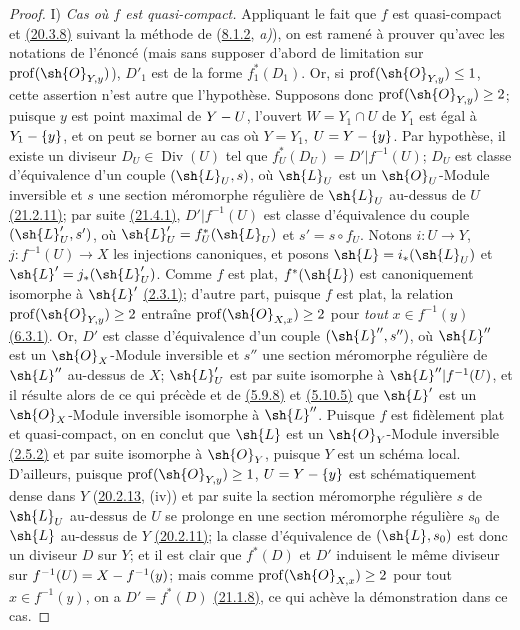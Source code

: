 \begin{proof}
\textup{I)} \emph{Cas où $f$ est quasi-compact.} Appliquant le fait que $f$
est quasi-compact et {\hyperlink{ega4.c04.prop.20-3-8}{(20.3.8)}}
suivant la méthode de ({\hyperref[canon-index.ega4.c04.statement.8-1-2]{8.1.2}},
\emph{a)}), on est ramené à prouver qu'avec les notations de l'énoncé (mais
sans supposer d'abord de limitation sur
$\operatorname{prof}(\sh{O}_{Y,y})$), $D'_1$ est de la forme
$f_1^*(D_1)$. Or, si $\operatorname{prof}(\sh{O}_{Y,y})\leq1$, cette
assertion n'est autre que l'hypothèse. Supposons donc
$\operatorname{prof}(\sh{O}_{Y,y})\geq2$; puisque $y$ est point maximal
de $Y- U$, l'ouvert $W=Y_1\cap U$ de $Y_1$ est égal à $Y_1-\{y\}$, et
on peut se borner au cas où $Y=Y_1$, $U=Y-\{y\}$. Par hypothèse, il
existe un diviseur $D_U\in\operatorname{Div}(U)$ tel que
$f_U^*(D_U)=D'|f^{-1}(U)$; $D_U$ est classe d'équivalence d'un couple
$(\sh{L}_U,s)$, où $\sh{L}_U$ est un $\sh{O}_U$-Module inversible et
$s$ une section méromorphe régulière de $\sh{L}_U$ au-dessus de $U$
{\hyperlink{ega4.c04.prop.21-2-11}{(21.2.11)}}; par suite
{\hyperlink{ega4.c04.statement.21-4-1}{(21.4.1)}},
$D'|f^{-1}(U)$ est classe d'équivalence du couple
$(\sh{L}'_U,s')$, où
$\sh{L}'_U=f_U^*(\sh{L}_U)$ et $s'=s\circ f_U$.
Notons $i:U\to Y$, $j:f^{-1}(U)\to X$ les injections canoniques, et
posons
$\sh{L}=i_*(\sh{L}_U)$ et
$\sh{L}'=j_*(\sh{L}'_U)$.
Comme $f$ est plat, $f^*(\sh{L})$ est canoniquement isomorphe à
$\sh{L}'$ {\hyperref[canon-index.ega4.c04.lem.2-3-1]{(2.3.1)}}; d'autre part,
puisque $f$ est plat, la relation
$\operatorname{prof}(\sh{O}_{Y,y})\geq2$ entraîne
$\operatorname{prof}(\sh{O}_{X,x})\geq2$ pour \emph{tout} $x\in f^{-1}(y)$
{\hyperref[canon-index.ega4.c04.prop.6-3-1]{(6.3.1)}}.
Or, $D'$ est classe d'équivalence d'un couple $(\sh{L}'',s'')$, où
$\sh{L}''$ est un $\sh{O}_X$-Module inversible et $s''$ une section
méromorphe régulière de $\sh{L}''$ au-dessus de $X$; $\sh{L}'_U$ est
par suite isomorphe à $\sh{L}''|f^{-1}(U)$, et il résulte alors de ce
qui précède et de {\hyperref[canon-index.ega4.c04.prop.5-9-8]{(5.9.8)}} et
{\hyperref[canon-index.ega4.c04.thm.5-10-5]{(5.10.5)}} que $\sh{L}'$ est un
$\sh{O}_X$-Module inversible isomorphe à $\sh{L}''$. Puisque $f$ est
fidèlement plat et quasi-compact, on en conclut que $\sh{L}$ est un
$\sh{O}_Y$-Module inversible
{\hyperref[canon-index.ega4.c04.prop.2-5-2]{(2.5.2)}} et par suite isomorphe à
$\sh{O}_Y$, puisque $Y$ est un schéma local. D'ailleurs, puisque
$\operatorname{prof}(\sh{O}_{Y,y})\geq1$, $U=Y-\{y\}$ est
schématiquement dense dans $Y$
({\hyperlink{ega4.c04.statement.20-2-13}{20.2.13}}, (iv)) et par suite
la section méromorphe régulière $s$ de $\sh{L}_U$ au-dessus de $U$ se
prolonge en une section méromorphe régulière $s_0$ de $\sh{L}$
au-dessus de $Y$ {\hyperlink{ega4.c04.prop.20-2-11}{(20.2.11)}}; la
classe d'équivalence de $(\sh{L},s_0)$ est donc un diviseur $D$ sur
$Y$; et il est clair que $f^*(D)$ et $D'$ induisent le même diviseur sur
$f^{-1}(U)=X- f^{-1}(y)$; mais comme
$\operatorname{prof}(\sh{O}_{X,x})\geq2$ pour tout $x\in f^{-1}(y)$,
on a $D'=f^*(D)$ {\hyperlink{ega4.c04.prop.21-1-8}{(21.1.8)}}, ce qui
achève la démonstration dans ce cas.


\end{proof}

